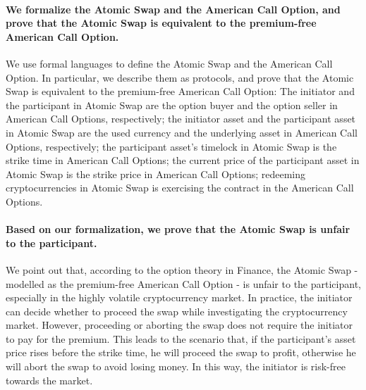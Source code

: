 \paragraph{We formalize the Atomic Swap and the American Call Option, and prove that the Atomic Swap is equivalent to the premium-free American Call Option.}
We use formal languages to define the Atomic Swap and the American Call Option.
In particular, we describe them as protocols, and prove that the Atomic Swap is equivalent to the premium-free American Call Option:
The initiator and the participant in Atomic Swap are the option buyer and the option seller in American Call Options, respectively;
the initiator asset and the participant asset in Atomic Swap are the used currency and the underlying asset in American Call Options, respectively;
the participant asset's timelock in Atomic Swap is the strike time in American Call Options;
the current price of the participant asset in Atomic Swap is the strike price in American Call Options;
redeeming cryptocurrencies in Atomic Swap is exercising the contract in the American Call Options.

\paragraph{Based on our formalization, we prove that the Atomic Swap is unfair to the participant.}
We point out that, according to the option theory in Finance, the Atomic Swap - modelled as the premium-free American Call Option - is unfair to the participant, especially in the highly volatile cryptocurrency market.
In practice, the initiator can decide whether to proceed the swap while investigating the cryptocurrency market.
However, proceeding or aborting the swap does not require the initiator to pay for the premium.
This leads to the scenario that, if the participant's asset price rises before the strike time, he will proceed the swap to profit, otherwise he will abort the swap to avoid losing money.
In this way, the initiator is risk-free towards the market.

